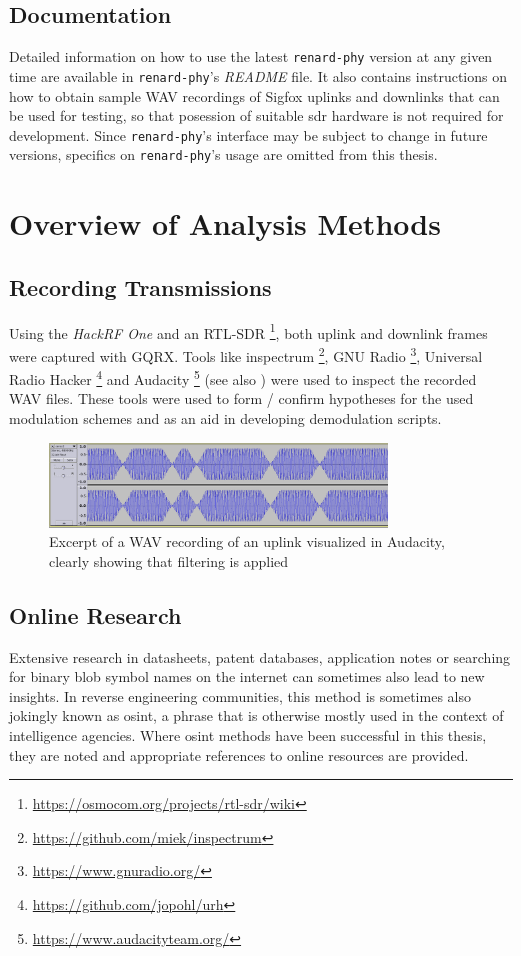 \begin{appendix}
\subsection{Documentation}
Detailed information on how to use the latest \texttt{renard-phy} version at any given time are available in \texttt{renard-phy}'s \textit{README} file.
It also contains instructions on how to obtain sample WAV recordings of Sigfox uplinks and downlinks that can be used for testing, so that posession of suitable \gls{sdr} hardware is not required for development.
Since \texttt{renard-phy}'s interface may be subject to change in future versions, specifics on \texttt{renard-phy}'s usage are omitted from this thesis.

\section{Overview of Analysis Methods}
\label{sec:analysismethods}
\subsection{Recording Transmissions}
Using the \textit{HackRF One} and an RTL-SDR \footnote{\url{https://osmocom.org/projects/rtl-sdr/wiki}}, both uplink and downlink frames were captured with GQRX.
Tools like inspectrum \footnote{\url{https://github.com/miek/inspectrum}}, GNU Radio \footnote{\url{https://www.gnuradio.org/}}, Universal Radio Hacker \footnote{\url{https://github.com/jopohl/urh}} and Audacity \footnote{\url{https://www.audacityteam.org/}} (see also ) were used to inspect the recorded WAV files.
These tools were used to form / confirm hypotheses for the used modulation schemes and as an aid in developing demodulation scripts.

\begin{figure}[h]
	\centering
	\includegraphics[width=0.8\textwidth]{fig/audacity_uplink.png}
	\caption{Excerpt of a WAV recording of an uplink visualized in Audacity, clearly showing that filtering is applied}
	\label{fig:audacity}
\end{figure}

\subsection{Online Research}
Extensive research in datasheets, patent databases, application notes or searching for binary blob symbol names on the internet can sometimes also lead to new insights.
In reverse engineering communities, this method is sometimes also jokingly known as \gls{osint}, a phrase that is otherwise mostly used in the context of intelligence agencies.
Where \gls{osint} methods have been successful in this thesis, they are noted and appropriate references to online resources are provided.

\end{appendix}
